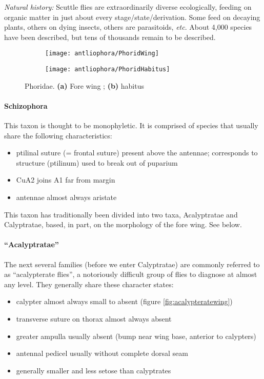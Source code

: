 \noindent{}\textit{Natural history:} Scuttle flies are extraordinarily diverse ecologically, feeding on organic matter in just about every stage/state/derivation. Some feed on decaying plants, others on dying insects, others are parasitoids, \textit{etc}. About 4,000 species have been described, but tens of thousands remain to be described.

\begin{figure}[ht!]
    \centering
    \begin{subfigure}[ht!]{0.45\textwidth}
        \texttt{[image: antliophora/PhoridWing]}
        \caption{}
        \label{fig:phorid1}
    \end{subfigure}
    \qquad
    \begin{subfigure}[ht!]{0.45\textwidth}
        \texttt{[image: antliophora/PhoridHabitus]}
        \caption{}
        \label{fig:phorid2}
    \end{subfigure}
    \caption{Phoridae. \textbf{(a)} Fore wing \citep[][Fig. 51.44]{mcalpine1981manualv2}; \textbf{(b)} habitus \citep[][Fig. 51.1]{mcalpine1981manualv2}}\label{fig:phorids}
\end{figure}

\paragraph{Schizophora} This taxon is thought to be monophyletic. It is comprised of species that usually share the following characteristics: 
\begin{itemize}
\item ptilinal suture (= frontal suture) present above the antennae; corresponds to structure (ptilinum) used to break out of puparium
\item CuA2 joins A1 far from margin
\item antennae almost always aristate
\end{itemize}
This taxon has traditionally been divided into two taxa, Acalyptratae and Calyptratae, based, in part, on the morphology of the fore wing. See below.

\paragraph{``Acalyptratae''} The next several families (before we enter Calyptratae) are commonly referred to as ``acalypterate flies'', a notoriously difficult group of flies to diagnose at almost any level. They generally share these character states:
\begin{itemize}
\item calypter almost always small to absent (figure \ref{fig:acalypteratewing})
\item transverse suture on thorax almost always absent
\item greater ampulla usually absent (bump near wing base, anterior to calypters)
\item antennal pedicel usually without complete dorsal seam
\item generally smaller and less setose than calyptrates
\end{itemize}

